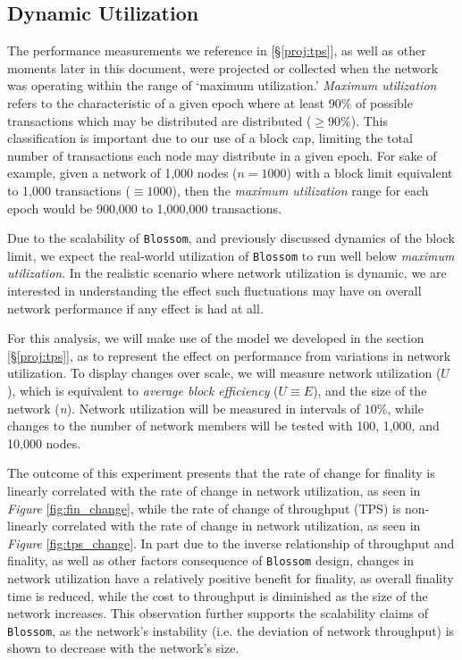 {\subsection{Dynamic Utilization}\label{proj:dyn_ut}
The performance measurements we reference in \textit{} [\S\ref{proj:tps}], as well as other moments later in this document, were projected or collected when the network was operating within the range of ‘maximum utilization.’ \textit{Maximum utilization} refers to the characteristic of a given epoch where at least \(90\%\) of possible transactions which may be distributed are distributed (\(\ge 90\%\)). This classification is important due to our use of a block cap, limiting the total number of transactions each node may distribute in a given epoch. For sake of example, given a network of 1,000 nodes (\(n=1000\)) with a block limit equivalent to 1,000 transactions (\(\equiv 1000\)), then the \textit{maximum utilization} range for each epoch would be 900,000 to 1,000,000 transactions.

Due to the scalability of \texttt{Blossom}, and previously discussed dynamics of the block limit, we expect the real-world utilization of \texttt{Blossom} to run well below \textit{maximum utilization}. In the realistic scenario where network utilization is dynamic, we are interested in understanding the effect such fluctuations may have on overall network performance if any effect is had at all.

For this analysis, we will make use of the model we developed in the section \textit{} [\S\ref{proj:tps}], as to represent the effect on performance from variations in network utilization. To display changes over scale, we will measure network utilization ($U$), which is equivalent to \textit{average block efficiency} (\(U \equiv E\)), and the size of the network (\textit{n}). Network utilization will be measured in intervals of \(10\%\), while changes to the number of network members will be tested with 100, 1,000, and 10,000 nodes.




The outcome of this experiment presents that the rate of change for finality is linearly correlated with the rate of change in network utilization, as seen in \textit{Figure} \ref{fig:fin_change}, while the rate of change of throughput (TPS) is non-linearly correlated with the rate of change in network utilization, as seen in \textit{Figure} \ref{fig:tps_change}. In part due to the inverse relationship of throughput and finality, as well as other factors consequence of \texttt{Blossom} design, changes in network utilization have a relatively positive benefit for finality, as overall finality time is reduced, while the cost to throughput is diminished as the size of the network increases. This observation further supports the scalability claims of \texttt{Blossom}, as the network’s instability (i.e. the deviation of network throughput) is shown to decrease with the network’s size.

}
